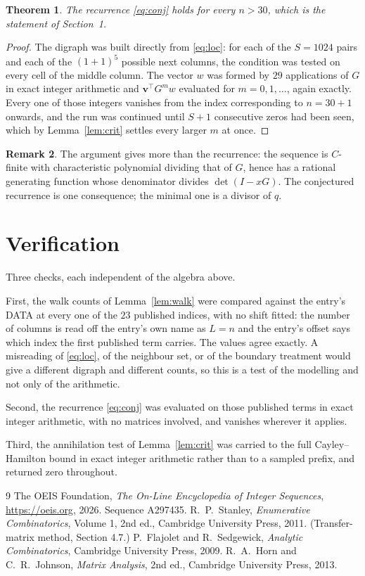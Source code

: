 \documentclass[11pt,a4paper]{article}
\theoremstyle{plain}
\newtheorem{theorem}{Theorem}
\theoremstyle{definition}
\newtheorem{remark}[theorem]{Remark}
\begin{document}
\begin{theorem}
The recurrence \eqref{eq:conj} holds for every $n>30$, which is the statement of
Section~1.
\end{theorem}

\begin{proof}
The digraph was built directly from \eqref{eq:loc}: for each of the $S=1024$ pairs and each
of the $(1+1)^{5}$ possible next columns, the condition was tested on every cell of
the middle column. The vector $w$ was formed by $29$ applications of $G$ in exact integer
arithmetic and $\mathbf{v}^{\!\top}G^{m}w$ evaluated for $m=0,1,\dots$, again exactly.
Every one of those integers vanishes from the index corresponding to $n=30+1$ onwards,
and the run was continued until $S+1$ consecutive zeros had been seen, which by
Lemma~\ref{lem:crit} settles every larger $m$ at once.
\end{proof}

\begin{remark}
The argument gives more than the recurrence: the sequence is $C$-finite with characteristic
polynomial dividing that of $G$, hence has a rational generating function whose denominator
divides $\det(I-xG)$. The conjectured recurrence is one consequence; the minimal one is a
divisor of $q$.
\end{remark}

\section{Verification}

Three checks, each independent of the algebra above.

First, the walk counts of Lemma~\ref{lem:walk} were compared against the entry's DATA at
every one of the $23$ published indices, with no shift fitted: the number of columns is
read off the entry's own name as $L=n$ and the entry's offset says which index the first
published term carries. The values agree exactly. A misreading of \eqref{eq:loc}, of the
neighbour set, or of the boundary treatment would give a different digraph and different
counts, so this is a test of the modelling and not only of the arithmetic.

Second, the recurrence \eqref{eq:conj} was evaluated on those published terms in exact
integer arithmetic, with no matrices involved, and vanishes wherever it applies.

Third, the annihilation test of Lemma~\ref{lem:crit} was carried to the full
Cayley--Hamilton bound in exact integer arithmetic rather than to a sampled prefix, and
returned zero throughout.

\begin{thebibliography}{9}
 The OEIS Foundation, \emph{The On-Line Encyclopedia of Integer
Sequences}, \url{https://oeis.org}, 2026. Sequence A297435.
 R.~P.~Stanley, \emph{Enumerative Combinatorics}, Volume 1, 2nd ed.,
Cambridge University Press, 2011. (Transfer-matrix method, Section 4.7.)
 P.~Flajolet and R.~Sedgewick, \emph{Analytic Combinatorics}, Cambridge
University Press, 2009.
 R.~A.~Horn and C.~R.~Johnson, \emph{Matrix Analysis}, 2nd ed., Cambridge
University Press, 2013.
\end{thebibliography}
\end{document}
